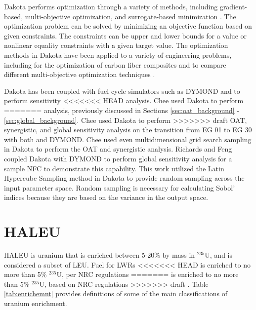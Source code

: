 Dakota performs optimization through a variety of methods, including
gradient-based, multi-objective optimization, and surrogate-based 
minimization \cite{adams_dakota_2021}. The optimization problem can be 
solved by minimizing an objective function based on given constraints. The 
constraints can be upper and lower bounds for a value or nonlinear 
equality constraints with a given target value. The optimization 
methods in Dakota have been applied to a variety of engineering problems,
including for the optimization of carbon fiber composites 
\cite{skulborstad_multi-objective_2018} and to compare different 
multi-objective optimization techniques \cite{chiandussi_comparison_2012}. 

Dakota has been coupled with fuel cycle simulators such as \gls{DYMOND} 
\cite{richards_application_2021} and \Cyclus \cite{chee_sensitivity_2019} 
to perform sensitivity 
<<<<<<< HEAD
analysis. Chee \cite{chee_sensitivity_2019} used Dakota to perform 
=======
analysis, previously discussed in Sections \ref{sec:oat_background} 
-\ref{sec:global_background}. Chee \cite{chee_sensitivity_2019} used Dakota to perform 
>>>>>>> draft
\gls{OAT}, synergistic, and global sensitivity analysis on the transition 
from \gls{EG} 01 to \gls{EG} 30 with both \Cyclus and \gls{DYMOND}. Chee used even 
multidimensional grid search sampling in Dakota to perform the \gls{OAT} 
and synergistic analysis. 
Richards and Feng \cite{richards_application_2021} coupled Dakota with 
\gls{DYMOND} to perform global sensitivity analysis for a sample \gls{NFC} 
to demonstrate this capability. This work utilized the Latin Hypercube 
Sampling method in Dakota to provide random sampling across the 
input parameter space. Random sampling is necessary for 
calculating Sobol' indices because they are based on the variance in 
the output space. 


%
%
%
\section{HALEU}
\gls{HALEU} is uranium that is enriched between 5-20\% by mass in 
$^{235}$U, and is considered a subset of \gls{LEU}. Fuel for \glspl{LWR} 
<<<<<<< HEAD
is enriched to no more than 5\% $^{235}$U, per \gls{NRC} regulations 
=======
is enriched to no more than 5\% $^{235}$U, based on \gls{NRC} regulations 
>>>>>>> draft
\cite{noauthor_10_2006}. Table \ref{tab:enrichemnt} provides definitions 
of some of the main classifications of uranium enrichment. 

